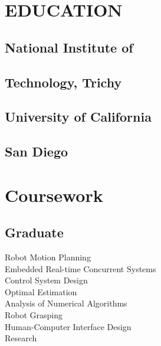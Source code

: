 \documentclass[]{deedy-resume-openfont}
\begin{document}
%
%
\lastupdated
%
%
\smaller
{}

%
%

\begin{minipage}[t]{0.33\textwidth} 


\section{EDUCATION}
\subsection{National Institute of} \subsection{Technology, Trichy }

\sectionsep

\subsection{University of California} \subsection{San Diego} 


\section{Coursework}

\subsection{Graduate}
Robot Motion Planning\\
Embedded Real-time Concurrent Systems\\
Control System Design\\
Optimal Estimation\\
Analysis of Numerical Algorithms\\
Robot Grasping\\
Human-Computer Interface Design \\ Research\\


\end{minipage}
\end{document}
